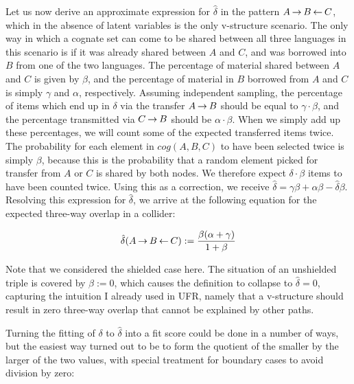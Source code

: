 Let us now derive an approximate expression for $\hat{\delta}$ in the pattern $A \kern 2pt\hbox{$\rightarrow$}\kern 2pt B \kern 2pt\hbox{$\leftarrow$}\kern 2pt C$, which in the absence of latent variables is the only v-structure scenario. The only way in which a cognate set can come to be shared between all three languages in this scenario is if it was already shared between $A$ and $C$, and was borrowed into $B$ from one of the two languages. The percentage of material shared between $A$ and $C$ is given by $\beta$, and the percentage of material in $B$ borrowed from $A$ and $C$ is simply $\gamma$ and $\alpha$, respectively. Assuming independent sampling, the percentage of items which end up in $\delta$ via the transfer $A \kern 2pt\hbox{$\rightarrow$}\kern 2pt B$ should be equal to $\gamma \cdot \beta$, and the percentage transmitted via $C \kern 2pt\hbox{$\rightarrow$}\kern 2pt B$ should be $\alpha \cdot \beta$. When we simply add up these percentages, we will count some of the expected transferred items twice. The probability for each element in $cog(A,B,C)$ to have been selected twice is simply $\beta$, because this is the 
probability that a random element picked for transfer from $A$ or $C$ is shared by both nodes. We therefore expect $\delta \cdot \beta$ items to have been counted twice. Using this as a correction, we receive $\hat{\delta} = \gamma \beta + \alpha \beta - \hat{\delta}\beta$. Resolving this expression for $\hat{\delta}$, we arrive at the following equation for the expected three-way overlap in a collider:

\begin{equation}
 \hat{\delta}(A \kern 2pt\hbox{$\rightarrow$}\kern 2pt B \kern 2pt\hbox{$\leftarrow$}\kern 2pt C) := \frac{\beta(\alpha + \gamma)}{1 + \beta}
\end{equation}

Note that we considered the shielded case here. The situation of an unshielded triple is covered by $\beta := 0$, which causes the definition to collapse to $\hat{\delta} = 0$, capturing the intuition I already used in UFR, namely that a v-structure should result in zero three-way overlap that cannot be explained by other paths.

Turning the fitting of $\delta$ to $\hat{\delta}$ into a fit score could be done in a number of ways, but the easiest way turned out to be to form the quotient of the smaller by the larger of the two values, with special treatment for boundary cases to avoid division by zero:

